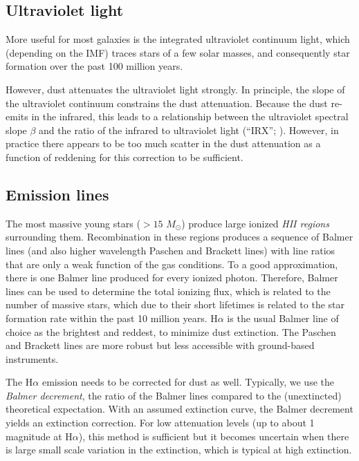\subsection{Ultraviolet light}

More useful for most galaxies is the integrated ultraviolet continuum
light, which (depending on the IMF) traces stars of a few solar
masses, and consequently star formation over the past 100 million
years.

However, dust attenuates the ultraviolet light strongly. In principle,
the slope of the ultraviolet continuum constrains the dust
attenuation. Because the dust re-emits in the infrared, this leads to
a relationship between the ultraviolet spectral slope $\beta$ and the
ratio of the infrared to ultraviolet light
(``IRX''; \citealt{overzier11a, grasha13a}). However, in practice
there appears to be too much scatter in the dust attenuation as a
function of reddening for this correction to be sufficient.

\subsection{Emission lines}

The most massive young stars ($>15$ $M_\odot$) produce large ionized
{\it HII regions} surrounding them. Recombination in these regions
produces a sequence of Balmer lines (and also higher wavelength
Paschen and Brackett lines) with line ratios that are only a weak
function of the gas conditions. To a good approximation, there is one
Balmer line produced for every ionized photon. Therefore, Balmer lines
can be used to determine the total ionizing flux, which is related to
the number of massive stars, which due to their short lifetimes is
related to the star formation rate within the past 10 million
years. H$\alpha$ is the usual Balmer line of choice as the brightest
and reddest, to minimize dust extinction. The Paschen and Brackett
lines are more robust but less accessible with ground-based
instruments.

The H$\alpha$ emission needs to be corrected for dust as well.
Typically, we use the {\it Balmer decrement}, the ratio of the Balmer
lines compared to the (unextincted) theoretical expectation. With an
assumed extinction curve, the Balmer decrement yields an extinction
correction. For low attenuation levels (up to about 1 magnitude at
H$\alpha$), this method is sufficient but it becomes uncertain when
there is large small scale variation in the extinction, which is
typical at high extinction.

